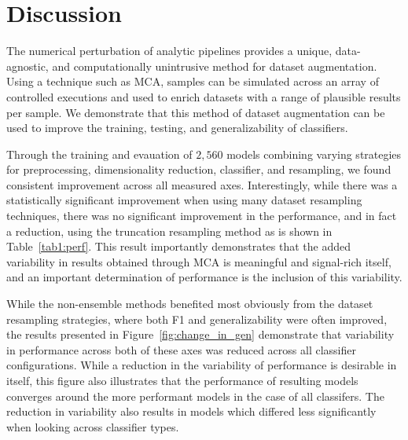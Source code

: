 \documentclass[10pt]{SelfArx} %
\begin{document}
\section*{Discussion}

The numerical perturbation of analytic pipelines provides a unique, data-agnostic, and computationally unintrusive
method for dataset augmentation. Using a technique such as MCA, samples can be simulated across an array of controlled
executions and used to enrich datasets with a range of plausible results per sample. We demonstrate that this method of
dataset augmentation can be used to improve the training, testing, and generalizability of classifiers.

Through the training and evauation of $2,560$ models combining varying strategies for preprocessing, dimensionality
reduction, classifier, and resampling, we found consistent improvement across all measured axes. Interestingly, while
there was a statistically significant improvement when using many dataset resampling techniques, there was no
significant improvement in the performance, and in fact a reduction, using the truncation resampling method as is shown
in Table~\ref{tab1:perf}. This result importantly demonstrates that the added variability in results obtained through
MCA is meaningful and signal-rich itself, and an important determination of performance is the inclusion of this
variability.

While the non-ensemble methods benefited most obviously from the dataset resampling strategies, where both F1 and
generalizability were often improved, the results presented in Figure~\ref{fig:change_in_gen} demonstrate that
variability in performance across both of these axes was reduced across all classifier configurations. While a
reduction in the variability of performance is desirable in itself, this figure also illustrates that the performance
of resulting models converges around the more performant models in the case of all classifers. The reduction in
variability also results in models which differed less significantly when looking across classifier types.
\end{document}
